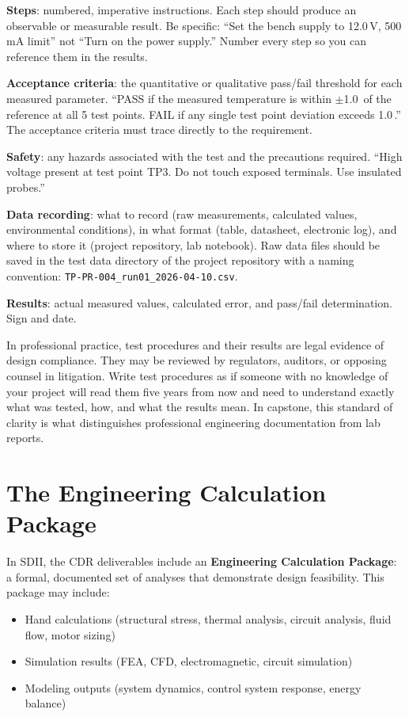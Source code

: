 \textbf{Steps}: numbered, imperative instructions. Each step should produce an observable or measurable result. Be specific: ``Set the bench supply to 12.0\,V, 500\,mA limit'' not ``Turn on the power supply.'' Number every step so you can reference them in the results.

\textbf{Acceptance criteria}: the quantitative or qualitative pass/fail threshold for each measured parameter. ``PASS if the measured temperature is within $\pm$1.0\,\degC{} of the reference at all 5 test points. FAIL if any single test point deviation exceeds 1.0\,\degC{}.'' The acceptance criteria must trace directly to the requirement.

\textbf{Safety}: any hazards associated with the test and the precautions required. ``High voltage present at test point TP3. Do not touch exposed terminals. Use insulated probes.''

\textbf{Data recording}: what to record (raw measurements, calculated values, environmental conditions), in what format (table, datasheet, electronic log), and where to store it (project repository, lab notebook). Raw data files should be saved in the test data directory of the project repository with a naming convention: \texttt{TP-PR-004\_run01\_2026-04-10.csv}.

\textbf{Results}: actual measured values, calculated error, and pass/fail determination. Sign and date.

\begin{warningbox}
In professional practice, test procedures and their results are legal evidence of design compliance. They may be reviewed by regulators, auditors, or opposing counsel in litigation. Write test procedures as if someone with no knowledge of your project will read them five years from now and need to understand exactly what was tested, how, and what the results mean. In capstone, this standard of clarity is what distinguishes professional engineering documentation from lab reports.
\end{warningbox}

\section{The Engineering Calculation Package}
In SDII, the CDR deliverables include an \textbf{Engineering Calculation Package}: a formal, documented set of analyses that demonstrate design feasibility. This package may include:

\begin{itemize}[nosep,leftmargin=1.5em]
\item Hand calculations (structural stress, thermal analysis, circuit analysis, fluid flow, motor sizing)
\item Simulation results (FEA, CFD, electromagnetic, circuit simulation)
\item Modeling outputs (system dynamics, control system response, energy balance)
\end{itemize}

